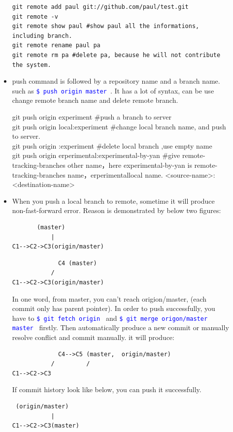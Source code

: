 \documentclass[a4paper,12pt,twoside]{book}
\newcommand{\linuxcommand}[1]{\texttt{\textcolor{blue}{\$ #1 \Pisymbol{psy}{191}}}}
\begin{document}
\begin{description}
\begin{itemize}
\begin{verbatim}
git remote add paul git://github.com/paul/test.git
git remote -v
git remote show paul #show paul all the informations, including branch.
git remote rename paul pa
git remote rm pa #delete pa, because he will not contribute the system.
\end{verbatim}

\item push command is followed by a repository name and a branch name.  such as \linuxcommand{push
    origin master}. It has a lot of syntax, can be use change remote branch name and delete remote branch.

git push origin experiment \#push a branch to server\\
git push origin local:experiment \#change local branch name, and push to server.  \\
git push origin :experiment \#delete local branch ,use empty name \\
git push origin erperimental:experimental-by-yan \#give remote-tracking-branches other name，here
experimental-by-yan is remote-tracking-branches name，erperimentallocal name.
<source-name>:<destination-name> \par

\item When you push a local branch to remote, sometime it will produce non-fast-forward error. Reason is
    demonstrated by below two figures:
\begin{verbatim}
       (master)
           |
C1-->C2->C3(origin/master)
\end{verbatim}

\begin{verbatim}
             C4 (master)
           /
C1-->C2->C3(origin/master)
\end{verbatim}
In one word, from master, you can't reach origion/master, (each commit only has parent pointer).  In order to
push successfully, you have to \linuxcommand{git fetch origin} and \linuxcommand{git merge origon/master
master} firstly. Then automatically produce a new commit or manually resolve conflict and commit manually. it
will produce:
\begin{verbatim}
             C4-->C5 (master,  origin/master)
           /         /
C1-->C2->C3
\end{verbatim}

\par

If commit history look like below, you can push it successfully.
\begin{verbatim}
 (origin/master)
           |
C1-->C2->C3(master)
\end{verbatim}
\end{itemize}



\end{description}
\end{document}
